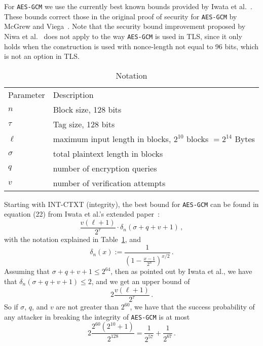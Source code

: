 \documentclass{article}
\newcommand{\defeq}{:=}
\begin{document}
For \texttt{AES-GCM} we use the currently best known bounds provided by Iwata et al.~\cite{GCMLNCS,cryptoeprint:2012:438}. These bounds correct those in the original proof of security for \texttt{AES-GCM} by McGrew and Viega~\cite{DBLP:conf/indocrypt/McGrewV04,DBLP:journals/iacr/McGrewV04}. Note that the security bound improvement proposed by Niwa et al.~\cite{DBLP:conf/fse/NiwaOMI15,DBLP:journals/iacr/NiwaOMI15} does not apply to the way \texttt{AES-GCM} is used in TLS, since it only holds when the construction is used with nonce-length not equal to 96 bits, which is not an option in TLS. 

\begin{table}[H]
  \centering
  \caption{Notation}\label{table:notation}
  \begin{tabular}{ll}
    \toprule
    Parameter & Description\\
    \cmidrule{1-2}
    $n$ & Block size, 128 bits\\
    $\tau$ & Tag size, 128 bits\\
    $\ell$ & maximum input length in blocks, $2^{10}$ blocks $ = 2^{14}$ Bytes\\
    $\sigma$ & total plaintext length in blocks\\
    $q$ & number of encryption queries\\
    $v$ & number of verification attempts\\
    \bottomrule
  \end{tabular}
\end{table}

Starting with INT-CTXT (integrity), the best bound for \texttt{AES-GCM} can be found in equation (22) from Iwata et al.'s extended paper~\cite{cryptoeprint:2012:438}:
\begin{equation}
  \frac{v(\ell+1)}{2^\tau}\cdot\delta_n(\sigma+q+v+1)\,,
\end{equation}
with the notation explained in Table~\ref{table:notation}, and
\begin{equation}
  \delta_n(x) \defeq \frac{1}{\left(1 - \frac{x-1}{2^n}\right)^{x/2}}\,.
\end{equation}
Assuming that $\sigma+q+v+1\le 2^{64}$, then as pointed out by Iwata et al., we have that $\delta_n(\sigma+q+v+1) \le 2$, and we get an upper bound of
\begin{equation}
  2\frac{v(\ell+1)}{2^\tau}\,.
\end{equation}
So if $\sigma$, $q$, and $v$ are not greater than $2^{60}$, we have that the success probability of any attacker in breaking the integrity of \texttt{AES-GCM} is at most
\begin{equation}
  2\frac{2^{60}(2^{10}+1)}{2^{128}} = \frac{1}{2^{57}} + \frac{1}{2^{67}}\,.
\end{equation}
\end{document}
